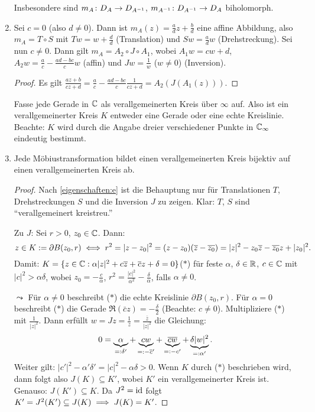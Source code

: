 \documentclass[a4paper,twoside,DIV15,BCOR12mm]{scrbook}
\begin{document}
\begin{enumerate}
Insbesondere sind $m_A\colon D_A\rightarrow D_{A^{-1}}$, $m_{A^{-1}}\colon D_{A^{-1}}\rightarrow D_A$ biholomorph.
\item\label{eigenschaften:e} Sei $c=0$ (also $d\neq0$). Dann ist $m_A(z) = \frac{a}{d}z + \frac{b}{d}$ eine affine Abbildung, also $m_A = T \circ S$
  mit $Tw=w+\frac{d}{d}$ (Translation) und $Sw = \frac{a}{d}w$ (Drehstreckung). Sei nun $c\neq0$. Dann gilt $m_A = A_2 \circ J
  \circ A_1$, wobei $A_1w = cw+d$, $A_2w = \frac{a}{c} - \frac{ad-bc}{c}w$ (affin) und $Jw = \frac1w$ ($w\neq0$) (Inversion).
  \begin{proof}
    Es gilt $\displaystyle\frac{az+b}{cz+d} = \frac{a}{c} - \frac{ad-bc}{c}\frac{1}{cz+d} = A_2(J(A_1(z)))$.
  \end{proof}
Fasse jede Gerade in $\mathbb{C}$ als verallgemeinerten Kreis über $\infty$ auf. Also ist ein verallgemeinerter Kreis $K$ entweder eine Gerade oder eine echte Kreislinie. Beachte: $K$ wird durch die Angabe dreier verschiedener Punkte in $\mathbb{C}_\infty$ eindeutig bestimmt.
\item\label{eigenschaften:f} Jede Möbiustransformation bildet einen verallgemeinerten Kreis bijektiv auf einen verallgemeinerten Kreis ab.
\begin{proof} Nach \ref{eigenschaften:e}
 ist die Behauptung nur für Translationen $T$, Drehstreckungen $S$ und die Inversion $J$ zu zeigen. Klar: $T$, $S$ sind ``verallgemeinert kreistreu.''

Zu $J$: Sei $r>0$, $z_0\in\mathbb{C}$. Dann:
\[z\in K:= \partial B(z_0,r)\iff r^2 = |z-z_0|^2 = (z-z_0)(\overline{z}-\overline{z_0}) = |z|^2-z_0\overline{z}-\overline{z_0}z+|z_0|^2.\]
Damit: $K=\{z\in\mathbb{C}: \alpha|z|^2+c\overline{z}+\overline{c}z+\delta = 0\}$\hfill($*$)
für feste $\alpha$, $\delta\in\mathbb{R}$, $c\in\mathbb{C}$ mit $|c|^2>\alpha\delta$, wobei $z_0=-\frac{c}{\alpha}$, $r^2=\frac{|c|^2}{\alpha^2}-\frac{\delta}{\alpha}$, falls $\alpha\neq 0$.

$\leadsto$ Für $\alpha\neq 0$ beschreibt ($*$) die echte Kreislinie $\partial B(z_0,r)$. Für $\alpha = 0$ beschreibt ($*$) die Gerade $\Re(\bar{c}z) = -\frac{\delta}{2}$ (Beachte: $c\neq 0$). Multipliziere ($*$) mit $\frac{1}{|z|^2}$. Dann erfüllt $w = Jz = \frac{1}{z} = \frac{\bar{z}}{|z|^2}$ die Gleichung:
\[ 0 = \underbrace{\alpha}_{=:\delta'} + \underbrace{cw}_{=: -\overline{c}'} + \underbrace{\overline{c}\overline{w}}_{=: -c'} + \underbrace{\delta|w|^2}_{=:\alpha'}.\]
Weiter gilt: $|c'|^2-\alpha'\delta' = |c|^2-\alpha\delta > 0$. Wenn $K$ durch ($*$) beschrieben wird, dann folgt also $J(K)\subseteq K'$, wobei $K'$ ein verallgemeinerter Kreis ist. Genauso: $J(K')\subseteq K$. Da $J^2 = \mathrm{id}$ folgt $K'=J^2(K')\subseteq J(K)\implies J(K)=K'$.
\end{proof}
\end{enumerate}
\end{document}
